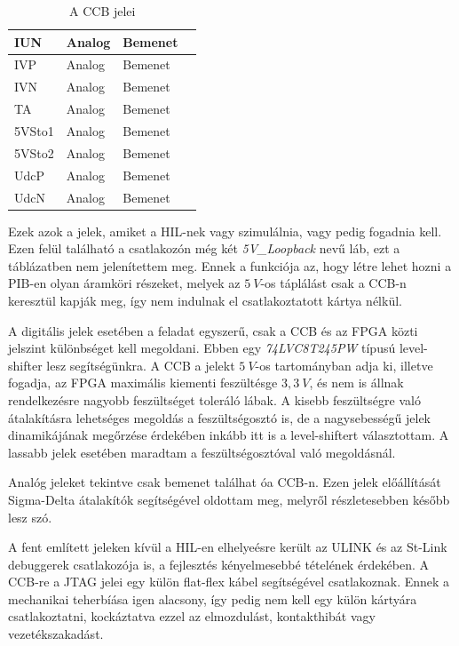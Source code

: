 \begin{table}[]
\begin{tabular}{|l|l|l|l|}
IUN            & Analog       & Bemenet      &                                 \\ \hline
IVP            & Analog       & Bemenet      &                                 \\ \hline
IVN            & Analog       & Bemenet      &                                 \\ \hline
TA             & Analog       & Bemenet      &                                 \\ \hline
5VSto1         & Analog       & Bemenet      &                                 \\ \hline
5VSto2         & Analog       & Bemenet      &                                 \\ \hline
UdcP           & Analog       & Bemenet      &                                 \\ \hline
UdcN           & Analog       & Bemenet      &                                 \\ \hline
\end{tabular}
\caption{A CCB jelei}
\label{ccbsignals}
\end{table}

Ezek azok a jelek, amiket a HIL-nek vagy szimulálnia, vagy pedig fogadnia kell. Ezen felül található a csatlakozón még két \emph{5V\_Loopback} nevű láb, ezt a táblázatben nem jelenítettem meg. Ennek a funkciója az, hogy létre lehet hozni a PIB-en olyan áramköri részeket, melyek az $5\ V$-os táplálást csak a CCB-n keresztül kapják meg, így nem indulnak el csatlakoztatott kártya nélkül.

A digitális jelek esetében a feladat egyszerű, csak a CCB és az FPGA közti jelszint különbséget kell megoldani. Ebben egy \emph{74LVC8T245PW} típusú level-shifter lesz segítségünkra. A CCB a jelekt $5\ V$-os tartományban adja ki, illetve fogadja, az FPGA maximális kiementi feszültésge $3,3\ V$, és nem is állnak rendelkezésre nagyobb feszültséget toleráló lábak. A kisebb feszültségre való átalakításra lehetséges megoldás a feszültségosztó is, de a nagysebességű jelek dinamikájának megőrzése érdekében inkább itt is a level-shiftert választottam. A lassabb jelek esetében maradtam a feszültségosztóval való megoldásnál.

Analóg jeleket tekintve csak bemenet találhat óa CCB-n. Ezen jelek előállítását Sigma-Delta átalakítók segítségével oldottam meg, melyről részletesebben később lesz szó.

A fent említett jeleken kívül a HIL-en elhelyeésre került az ULINK és az St-Link debuggerek csatlakozója is, a fejlesztés kényelmesebbé tételének érdekében. A CCB-re a JTAG jelei egy külön flat-flex kábel segítségével csatlakoznak. Ennek a mechanikai teherbíása igen alacsony, így pedig nem kell egy külön kártyára csatlakoztatni, kockáztatva ezzel az elmozdulást, kontakthibát vagy vezetékszakadást.

